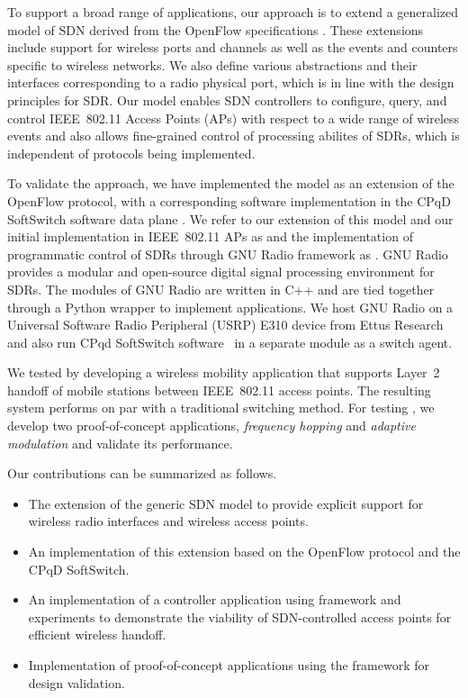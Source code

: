 To support a broad range of applications, our approach is to extend a generalized model of SDN derived from the OpenFlow specifications \cite{Casey:14}.  These extensions include support for wireless ports and channels as well as the events and counters specific to wireless networks. We also define various abstractions and their interfaces corresponding to a radio physical port, which is in line with the design principles for SDR. Our model enables SDN controllers to configure, query, and control IEEE~802.11 Access Points (APs) with respect to a wide range of wireless events and also allows fine-grained control of processing abilites of SDRs, which is independent of protocols being implemented. 

To validate the approach, we have implemented the model as an extension of the OpenFlow protocol, with a corresponding software implementation in the CPqD SoftSwitch software data plane \cite{ofsoftswitch13}. We refer to our extension of this model and our initial implementation in IEEE~802.11 APs as {\em \aetherflow} and the implementation of programmatic control of SDRs through GNU Radio \cite{gnuradio} framework as {\em \crossflow}. GNU Radio provides a modular and open-source digital signal processing environment for SDRs. The modules of GNU Radio are written in C++ and are tied together through a Python wrapper to implement applications. We host GNU Radio on a Universal Software Radio Peripheral (USRP) E310 device from Ettus Research and also run CPqd SoftSwitch software~\cite{ofsoftswitch13} in a separate module as a switch agent.

We tested {\em \aetherflow} by developing a wireless mobility application that supports Layer~2 handoff of mobile stations between IEEE~802.11 access points. The resulting system performs on par with a traditional switching method. For testing {\em \crossflow}, we develop two proof-of-concept applications, \emph{frequency hopping} and \emph{adaptive modulation} and validate its performance.

Our contributions can be summarized as follows.

\begin{itemize}
\item The extension of the generic SDN model to provide explicit support for wireless radio interfaces and wireless access points.

\item An implementation of this extension based on the OpenFlow protocol and the CPqD SoftSwitch.

\item An implementation of a controller application using \aetherflow framework and experiments to demonstrate the viability of SDN-controlled access points for
efficient wireless handoff.

\item Implementation of proof-of-concept  applications using the \crossflow framework for design validation.
\end{itemize}


